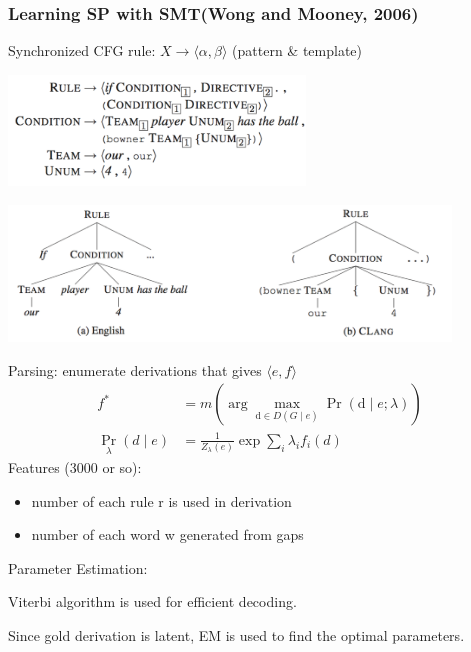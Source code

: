 \documentclass{beamer}
\begin{document}
\begin{frame}
    \frametitle{Learning SP with SMT(Wong and Mooney, 2006)}
     {
        Synchronized CFG rule: $X \to \langle \alpha, \beta \rangle$
        (pattern \& template)
        \begin{center}
            \includegraphics[width=7.88cm,height=2.94cm]{img/scfg-rule.png}

            \includegraphics[width=11.74cm,height=3.64cm]{img/scfg-parse.png}
        \end{center}
    }

     {
        Parsing: enumerate derivations that gives $\langle e, f \rangle$
        \begin{align*}
            f^* &= m(\arg\max_{\mathrm{d}\in D(G\mid e)}\Pr(\mathrm{d}\mid e; \lambda)) \\
            \Pr_\lambda(d\mid e) &= \frac{1}{Z_\lambda(e)}\exp\sum_i\lambda_i f_i(d)
        \end{align*}
        Features (3000 or so):
        \begin{itemize}
            \item number of each rule r is used in derivation
            \item number of each word w generated from gaps
        \end{itemize}

        Parameter Estimation: 

        Viterbi algorithm is used for efficient decoding.

        Since gold derivation is latent, EM is used to find the optimal parameters.
    }

\end{frame}
\end{document}
